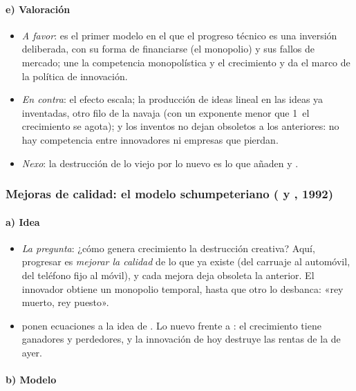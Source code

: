 \documentclass[11pt]{article}
\begin{document}
\paragraph{e) Valoración}

\begin{itemize}
\item \emph{A favor}: es el primer modelo en el que el progreso técnico es una inversión deliberada, con su forma de financiarse (el monopolio) y sus fallos de mercado; une la competencia monopolística y el crecimiento y da el marco de la política de innovación.
\item \emph{En contra}: el efecto escala; la producción de ideas lineal en las ideas ya inventadas, otro filo de la navaja (con un exponente menor que 1~el crecimiento se agota); y los inventos no dejan obsoletos a los anteriores: no hay competencia entre innovadores ni empresas que pierdan.
\item \emph{Nexo}: la destrucción de lo viejo por lo nuevo es lo que añaden  y .
\end{itemize}

\subsubsection{Mejoras de calidad: el modelo schumpeteriano ( y , 1992)}\label{sec:aghion-howitt}

\paragraph{a) Idea}

\begin{itemize}
\item \emph{La pregunta}: ¿cómo genera crecimiento la destrucción creativa? Aquí, progresar es \emph{mejorar la calidad} de lo que ya existe (del carruaje al automóvil, del teléfono fijo al móvil), y cada mejora deja obsoleta la anterior. El innovador obtiene un monopolio temporal, hasta que otro lo desbanca: «rey muerto, rey puesto».
\item \textcite{AghionHowitt1992} ponen ecuaciones a la idea de . Lo nuevo frente a : el crecimiento tiene ganadores y perdedores, y la innovación de hoy destruye las rentas de la de ayer.
\end{itemize}

\paragraph{b) Modelo}
\end{document}
